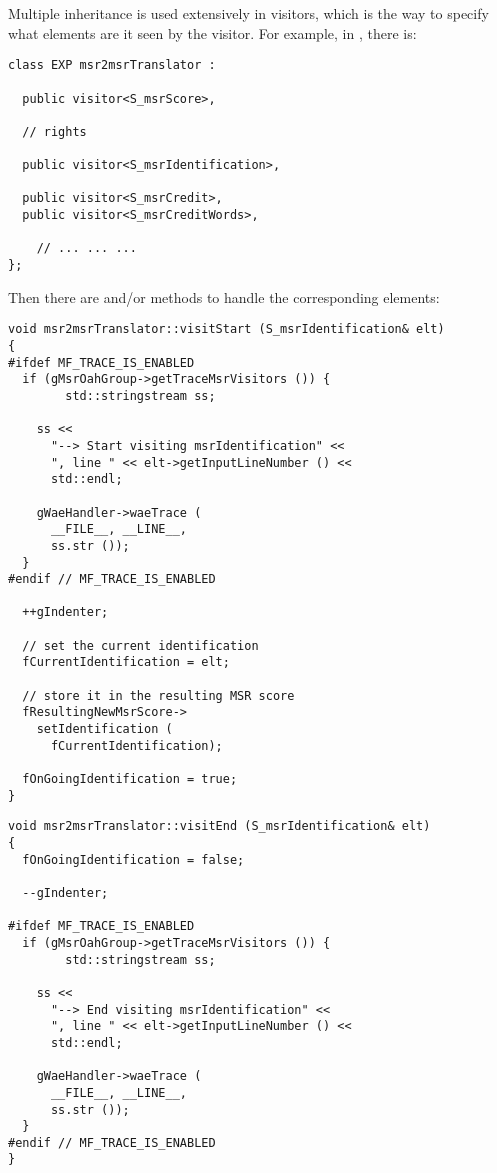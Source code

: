 Multiple inheritance is used extensively in visitors, which is the way to specify what elements are {it seen} by the visitor. For example, in , there is:
\begin{lstlisting}[language=CPlusPlus]
class EXP msr2msrTranslator :

  public visitor<S_msrScore>,

  // rights

  public visitor<S_msrIdentification>,

  public visitor<S_msrCredit>,
  public visitor<S_msrCreditWords>,

    // ... ... ...
};
\end{lstlisting}

Then there are  and/or  methods to handle the corresponding elements:
\begin{lstlisting}[language=CPlusPlus]
void msr2msrTranslator::visitStart (S_msrIdentification& elt)
{
#ifdef MF_TRACE_IS_ENABLED
  if (gMsrOahGroup->getTraceMsrVisitors ()) {
		std::stringstream ss;

    ss <<
      "--> Start visiting msrIdentification" <<
      ", line " << elt->getInputLineNumber () <<
      std::endl;

    gWaeHandler->waeTrace (
      __FILE__, __LINE__,
      ss.str ());
  }
#endif // MF_TRACE_IS_ENABLED

  ++gIndenter;

  // set the current identification
  fCurrentIdentification = elt;

  // store it in the resulting MSR score
  fResultingNewMsrScore->
    setIdentification (
      fCurrentIdentification);

  fOnGoingIdentification = true;
}
\end{lstlisting}

\begin{lstlisting}[language=CPlusPlus]
void msr2msrTranslator::visitEnd (S_msrIdentification& elt)
{
  fOnGoingIdentification = false;

  --gIndenter;

#ifdef MF_TRACE_IS_ENABLED
  if (gMsrOahGroup->getTraceMsrVisitors ()) {
		std::stringstream ss;

    ss <<
      "--> End visiting msrIdentification" <<
      ", line " << elt->getInputLineNumber () <<
      std::endl;

    gWaeHandler->waeTrace (
      __FILE__, __LINE__,
      ss.str ());
  }
#endif // MF_TRACE_IS_ENABLED
}
\end{lstlisting}

